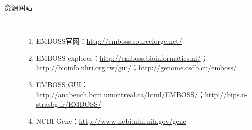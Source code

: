 \begin{description}
	\item[资源网站] \ 
		\begin{enumerate}
			\item EMBOSS官网：\href{http://emboss.sourceforge.net/}{http://emboss.sourceforge.net/}
			\item EMBOSS explorer：\href{http://emboss.bioinformatics.nl/}{http://emboss.bioinformatics.nl/}；\href{http://bioinfo.nhri.org.tw/gui/}{http://bioinfo.nhri.org.tw/gui/}；\href{http://genome.csdb.cn/emboss/}{http://genome.csdb.cn/emboss/}
			\item EMBOSS GUI：\href{http://anabench.bcm.umontreal.ca/html/EMBOSS/}{http://anabench.bcm.umontreal.ca/html/EMBOSS/}；\href{http://bips.u-strasbg.fr/EMBOSS/}{http://bips.u-strasbg.fr/EMBOSS/}
			\item NCBI Gene：\href{http://www.ncbi.nlm.nih.gov/gene}{http://www.ncbi.nlm.nih.gov/gene}
		\end{enumerate}
\end{description}


